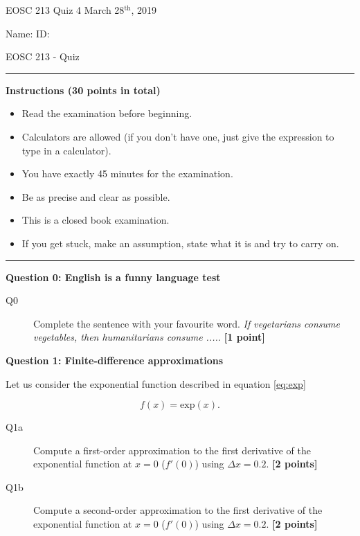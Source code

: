 \documentclass{article}
\begin{document}
\pagestyle{first}


\large{EOSC 213 Quiz 4} \hspace{10cm} \large{March 28$^{\textrm{th}}$, 2019}

\large{Name:} \hspace{12cm} \large{ID: }
\begin{center}
\Huge{EOSC 213 - Quiz}
\end{center}

\rule{\textwidth}{1pt}

\large{\textbf{Instructions (30 points in total)}}
\begin{multicols}{2}
\begin{itemize}
\item Read the examination before beginning.
\item Calculators are allowed (if you don't have one, just give the expression to type in a calculator).
\item You have exactly 45 minutes for the examination.
\item Be as precise and clear as possible.
\item This is a closed book examination.
\item If you get stuck, make an assumption, state what it is and try to carry on.
\end{itemize} 
\end{multicols}



\rule{\textwidth}{1pt}

\textbf{Question 0: English is a funny language test}

\begin{description}
\item [Q0] Complete the sentence with your favourite word. \textit{If vegetarians consume vegetables, then humanitarians consume .....}  \textbf{[1 point]}
\vspace{0.5cm}

\end{description}

\textbf{Question 1: Finite-difference approximations}

Let us consider the exponential function described in equation \ref{eq:exp}

\begin{equation}
f(x) = \mathrm{exp}(x). \label{eq:exp}
\end{equation} 


\begin{description}
\item [Q1a] Compute a first-order approximation to the first derivative of the exponential function at $x = 0$ ($f'(0)$) using $\Delta x  = 0.2$.  \textbf{[2 points]}
\vspace{3cm}
\item [Q1b] Compute a second-order approximation to the first derivative of the exponential function at $x = 0$ ($f'(0)$) using $\Delta x  = 0.2$.  \textbf{[2 points]}
\vspace{3cm}

\end{description}
\end{document}
